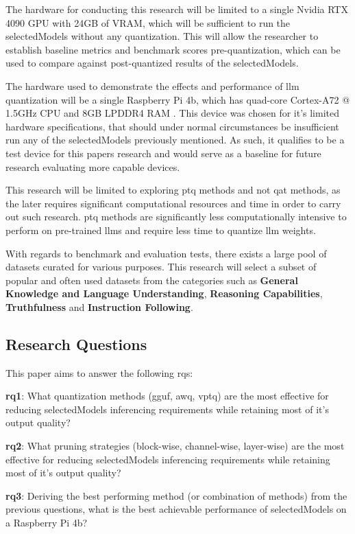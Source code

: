 \documentclass{ifacconf}
\begin{document}
	The hardware for conducting this research will be limited to a single Nvidia RTX 4090 GPU with 24GB of VRAM, which will be sufficient to run the \gls{selectedModels} without any quantization. This will allow the researcher to establish baseline metrics and benchmark scores pre-quantization, which can be used to compare against post-quantized results of the \gls{selectedModels}.
	
	The hardware used to demonstrate the effects and performance of \gls{llm} quantization will be a single Raspberry Pi 4b, which has quad-core Cortex-A72 @ 1.5GHz CPU and 8GB LPDDR4 RAM \cite{raspberrypi4}. This device was chosen for it's limited hardware specifications, that should under normal circumstances be insufficient run any of the \gls{selectedModels} previously mentioned. As such, it qualifies to be a test device for this papers research and would serve as a baseline for future research evaluating more capable devices.
	
	This research will be limited to exploring \gls{ptq} methods and not \gls{qat} methods, as the later requires significant computational resources and time in order to carry out such research. \gls{ptq} methods are significantly less computationally intensive to perform on pre-trained \glspl{llm} and require less time to quantize \gls{llm} weights.
	
	With regards to benchmark and evaluation tests, there exists a large pool of datasets curated for various purposes. This research will select a subset of popular and often used datasets from the categories such as \textbf{General Knowledge and Language Understanding}, \textbf{Reasoning Capabilities}, \textbf{Truthfulness} and \textbf{Instruction Following}.
	
	\subsection{Research Questions}
	This paper aims to answer the following \glspl{rq}:
	
	\textbf{\gls{rq}1}: What quantization methods (\gls{gguf}, \gls{awq}, \gls{vptq}) are the most effective for reducing \gls{selectedModels} inferencing requirements while retaining most of it's output quality?
	
	\textbf{\gls{rq}2}: What pruning strategies (block-wise, channel-wise, layer-wise) are the most effective for reducing \gls{selectedModels} inferencing requirements while retaining most of it's output quality?
	
	\textbf{\gls{rq}3}: Deriving the best performing method (or combination of methods) from the previous questions, what is the best achievable performance of \gls{selectedModels} on a Raspberry Pi 4b?
	
\end{document}

